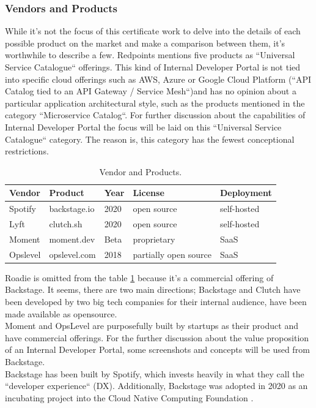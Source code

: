 \documentclass[a4paper,12pt]{article}
\begin{document}
    \subsubsection{Vendors and Products}
    \label{sssec:vendors}
    While it's not the focus of this certificate work to delve into the details of each possible product on the market
    and make a comparison between them, it's worthwhile to describe a few.
    Redpoints mentions five products as ``Universal Service Catalogue`` offerings\parencite{devportalsprimer}.
    This kind of Internal Developer Portal is not tied into specific cloud offerings such as AWS, Azure or Google
    Cloud Platform (``API Catalog tied to an API Gateway / Service Mesh``)and has no opinion about a particular application
    architectural style, such as the products mentioned in the category ``Microservice Catalog``.
    For further discussion about the capabilities of Internal Developer Portal the focus will be laid on this
    ``Universal Service Catalogue`` category.
    The reason is, this category has the fewest conceptional restrictions.\\
    \begin{table}[!htbp]
        \begin{center}
            \begin{tabularx}{\textwidth}{lllll}
                \toprule
                Vendor   & Product      & Year & License               & Deployment  \\
                \midrule
                Spotify  & backstage.io & 2020 & open source           & self-hosted \\
                Lyft     & clutch.sh    & 2020 & open source           & self-hosted \\
                Moment   & moment.dev   & Beta & proprietary           & SaaS        \\
                Opslevel & opslevel.com & 2018 & partially open source & SaaS        \\
                \bottomrule
            \end{tabularx}
            \caption{\label{tab:vendors} Vendor and Products.}
        \end{center}
    \end{table}
    Roadie is omitted from the table \ref{tab:vendors} because it's a commercial offering of Backstage.
    It seems, there are two main directions; Backstage and Clutch have been developed by two big tech companies for their
    internal audience, have been made available as opensource.\\
    Moment and OpsLevel are purposefully built by startups as their product and have commercial offerings.
    For the further discussion about the value proposition of an Internal Developer Portal, some screenshots and concepts will
    be used from Backstage.\\
    Backstage has been built by Spotify, which invests heavily in what they call the
    ``developer experience`` (DX)\parencite{spotifydx}.
    Additionally, Backstage was adopted in 2020 as an incubating project into the Cloud Native Computing Foundation\parencite{cncf} .
\end{document}
